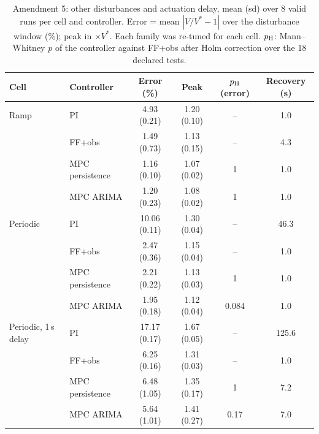 \begin{table}[t]\centering\small
\caption{Amendment 5: other disturbances and actuation delay, mean (sd) over 8 valid runs per cell and controller. Error = mean $|V/V^*-1|$ over the disturbance window (\%); peak in $\times V^*$. Each family was re-tuned for each cell. $p_{\rm H}$: Mann--Whitney $p$ of the controller against FF+obs after Holm correction over the 18 declared tests.}\label{tab:scn}
\begin{tabular}{llcccc}\toprule
Cell & Controller & Error (\%) & Peak & $p_{\rm H}$ (error) & Recovery (s)\\\midrule
Ramp & PI & 4.93 (0.21) & 1.20 (0.10) & -- & 1.0\\
 & FF+obs & 1.49 (0.73) & 1.13 (0.15) & -- & 4.3\\
 & MPC persistence & 1.16 (0.10) & 1.07 (0.02) & 1 & 1.0\\
 & MPC ARIMA & 1.20 (0.23) & 1.08 (0.02) & 1 & 1.0\\\midrule
Periodic & PI & 10.06 (0.11) & 1.30 (0.04) & -- & 46.3\\
 & FF+obs & 2.47 (0.36) & 1.15 (0.04) & -- & 1.0\\
 & MPC persistence & 2.21 (0.22) & 1.13 (0.03) & 1 & 1.0\\
 & MPC ARIMA & 1.95 (0.18) & 1.12 (0.04) & 0.084 & 1.0\\\midrule
Periodic, 1\,s delay & PI & 17.17 (0.17) & 1.67 (0.05) & -- & 125.6\\
 & FF+obs & 6.25 (0.16) & 1.31 (0.03) & -- & 1.0\\
 & MPC persistence & 6.48 (1.05) & 1.35 (0.17) & 1 & 7.2\\
 & MPC ARIMA & 5.64 (1.01) & 1.41 (0.27) & 0.17 & 7.0\\
\bottomrule\end{tabular}\end{table}
